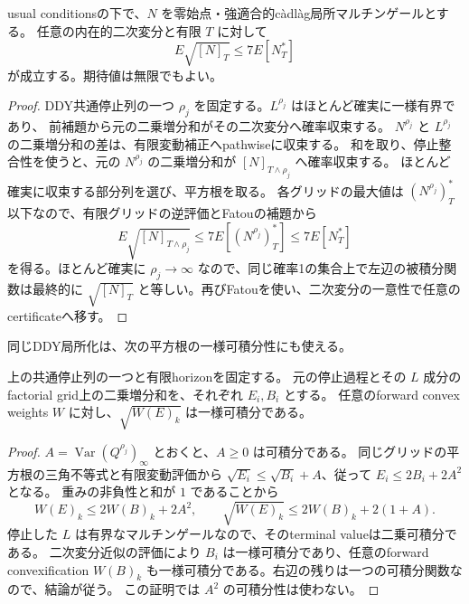 \begin{theorem}[一般局所マルチンゲールの逆Davis評価]
usual conditionsの下で、$N$ を零始点・強適合的c\`adl\`ag局所マルチンゲールとする。
任意の内在的二次変分と有限 $T$ に対して
\[
 E\sqrt{[N]_T}\le7E[N_T^*]
\]
が成立する。期待値は無限でもよい。
\end{theorem}
\begin{proof}
DDY共通停止列の一つ $\rho_j$ を固定する。$L^{\rho_j}$ はほとんど確実に一様有界であり、
前補題から元の二乗増分和がその二次変分へ確率収束する。
$N^{\rho_j}$ と $L^{\rho_j}$ の二乗増分和の差は、有限変動補正へpathwiseに収束する。
和を取り、停止整合性を使うと、元の $N^{\rho_j}$ の二乗増分和が
$[N]_{T\wedge\rho_j}$ へ確率収束する。
ほとんど確実に収束する部分列を選び、平方根を取る。
各グリッドの最大値は $(N^{\rho_j})_T^*$ 以下なので、有限グリッドの逆評価とFatouの補題から
\[
 E\sqrt{[N]_{T\wedge\rho_j}}
 \le7E[(N^{\rho_j})_T^*]\le7E[N_T^*]
\]
を得る。ほとんど確実に $\rho_j\to\infty$ なので、同じ確率1の集合上で左辺の被積分関数は最終的に
$\sqrt{[N]_T}$ と等しい。再びFatouを使い、二次変分の一意性で任意のcertificateへ移す。
\end{proof}

同じDDY局所化は、次の平方根の一様可積分性にも使える。

\begin{lemma}[凸結合した二乗増分和の平方根の一様可積分性]
上の共通停止列の一つと有限horizonを固定する。
元の停止過程とその $L$ 成分のfactorial grid上の二乗増分和を、それぞれ $E_i,B_i$ とする。
任意のforward convex weights $W$ に対し、$\sqrt{W(E)_k}$ は一様可積分である。
\end{lemma}
\begin{proof}
$A=\operatorname{Var}(Q^{\rho_j})_\infty$ とおくと、$A\ge0$ は可積分である。
同じグリッドの平方根の三角不等式と有限変動評価から
$\sqrt{E_i}\le\sqrt{B_i}+A$、従って $E_i\le2B_i+2A^2$ となる。
重みの非負性と和が $1$ であることから
\[
 W(E)_k\le2W(B)_k+2A^2,\qquad
 \sqrt{W(E)_k}\le2W(B)_k+2(1+A).
\]
停止した $L$ は有界なマルチンゲールなので、そのterminal valueは二乗可積分である。
二次変分近似の評価により $B_i$ は一様可積分であり、任意のforward convexification
$W(B)_k$ も一様可積分である。右辺の残りは一つの可積分関数なので、結論が従う。
この証明では $A^2$ の可積分性は使わない。
\end{proof}

